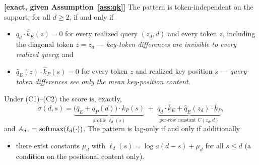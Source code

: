 \documentclass{article}
\begin{document}
\begin{theorem}[characterization]\label{thm:characterization}
\textbf{[exact, given Assumption~\ref{ass:qk}]} The pattern is token-independent on the support, for all $d \ge 2$, if and only if
\begin{itemize}
    \item[\textbf{(C1)}] $q_d \cdot \hat k_E(z) = 0$ for every realized query $(z_d, d)$ and every token $z$, including the diagonal token $z = z_d$ --- \emph{key-token differences are invisible to every realized query}; and
    \item[\textbf{(C2)}] $\hat q_E(z) \cdot \hat k_P(s) = 0$ for every token $z$ and realized key position $s$ --- \emph{query-token differences see only the mean key-position content}.
\end{itemize}
Under (C1)--(C2) the score is, exactly,
\begin{equation}\label{eq:scoresplit}
    \sigma(d,s) = \underbrace{\big(\bar q_E + q_P(d)\big)\cdot k_P(s)}_{\text{profile } \ell_d(s)}
    \;+\; \underbrace{q_d\cdot\bar k_E + \hat q_E(z_d)\cdot\bar k_P}_{\text{per-row constant } C(z_d, d)} ,
\end{equation}
and $A_{d,\cdot} = \textrm{softmax}(\ell_d(\cdot))$. The pattern is lag-only if and only if additionally
\begin{itemize}
    \item[\textbf{(C3)}] there exist constants $\mu_d$ with $\ell_d(s) = \log a(d-s) + \mu_d$ for all $s \le d$ (a condition on the positional content only).
\end{itemize}
\end{theorem}
\end{document}
